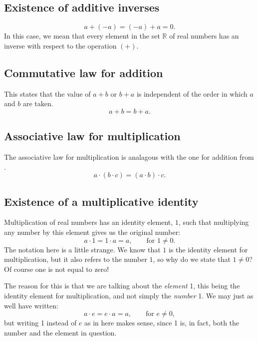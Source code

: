 \subsection{Existence of additive inverses}
\begin{equation}
    a + (-a) = (-a) + a = 0.
\end{equation}
In this case, we mean that every element in the set $\mathbb{R}$ of real numbers
has an inverse with respect to the operation $(+)$.\cite[p.~14]{pinter}

\subsection{Commutative law for addition}
\label{sec:alg:comm:add}
This states that the value of $a + b$ or $b + a$ is independent of the order
in which $a$ and $b$ are taken.\cite[p.~14]{pinter}
\begin{equation}
    a + b = b + a.
\end{equation}

\subsection{Associative law for multiplication}
The associative law for multiplication is analagous with the one for
addition from .
\begin{equation}
    a \cdot (b \cdot c) = (a \cdot b) \cdot c.
\end{equation}

\subsection{Existence of a multiplicative identity}
\label{sec:mult:id}
Multiplication of real numbers has an identity element, $1$,
such that multiplying any number by this element gives us the original number:
\begin{equation}
    a \cdot 1 = 1 \cdot a = a, \qquad \text{for } 1 \neq 0.
    \label{eq:mult:id}
\end{equation}
The notation here is a little strange.
We know that $1$ is the identity element for multiplication, but it also
refers to the number $1$, so why do we state that $1 \neq 0$?
Of course one is not equal to zero!

The reason for this is that we are talking about the \emph{element} 1, this
being the identity element for multiplication, and not simply the \emph{number}
1. We may just as well have written:
\begin{equation*}
    a \cdot e = e \cdot a = a, \qquad \text{for } e \neq 0,
\end{equation*}
but writing 1 instead of $e$ as in  here makes sense,
since 1 is, in fact, both the number and the element in question.

